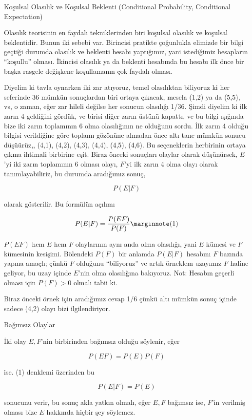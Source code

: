 \documentclass[12pt,fleqn]{article}\usepackage{../../common}
\begin{document}
Koşulsal Olasılık ve Koşulsal Beklenti  (Conditional Probability, Conditional Expectation)

Olasılık teorisinin en faydalı tekniklerinden biri koşulsal olasılık ve koşulsal
beklentidir. Bunun iki sebebi var. Birincisi pratikte çoğunlukla elimizde bir
bilgi geçtiği durumda olasılık ve beklenti hesabı yaptığımız, yani istediğimiz
hesapların ``koşullu'' olması. İkincisi olasılık ya da beklenti hesabında bu
hesabı ilk önce bir başka rasgele değişkene koşullamanın çok faydalı olması.

Diyelim ki tavla oynarken iki zar atıyoruz, temel olasılıktan biliyoruz ki her
seferinde 36 mümkün sonuçlardan biri ortaya çıkacak, mesela (1,2) ya da (5,5),
vs, o zaman, eğer zar hileli değilse her sonucun olasılığı 1/36. Şimdi diyelim
ki ilk zarın 4 geldiğini gördük, ve birisi diğer zarın üstünü kapattı, ve bu
bilgi ışığında bize iki zarın toplamının 6 olma olasılığının ne olduğunu
sordu. İlk zarın 4 olduğu bilgisi verildiğine göre toplamı gözönüne almadan önce
altı tane mümkün sonucu düşüürüz,, (4,1), (4,2), (4,3), (4,4), (4,5), (4,6). Bu
seçeneklerin herbirinin ortaya çıkma ihtimali birbirine eşit. Biraz önceki
sonuçları olaylar olarak düşünürsek, $E$'yi iki zarın toplamının 6 olması olayı,
$F$'yi ilk zarın 4 olma olayı olarak tanımlayabiliriz, bu durumda aradığımız
sonuç,

$$ P(E|F) $$

olarak gösterilir. Bu formülün açılımı

$$ P(E|F) = \frac{P(EF)}{P(F)}
\mlabel{1}$$

$P(EF)$ hem $E$ hem $F$ olaylarının aynı anda olma olasılığı, yani $E$ kümesi ve
$F$ kümesinin kesişimi. Bölendeki $P(F)$ bir anlamda $P(E|F)$ hesabını $F$
bazında yapma amaçlı; çünkü $F$ olduğunu ``biliyoruz'' ve artık örneklem
uzayımız $F$ haline geliyor, bu uzay içinde $E$'nin olma olasılığına
bakıyoruz. Not: Hesabın geçerli olması için $P(F)>0$ olmalı tabii ki. 

Biraz önceki örnek için aradığımız cevap 1/6 çünkü altı mümkün sonuç içinde
sadece (4,2) olayı bizi ilgilendiriyor. 

Bağımsız Olaylar

İki olay $E,F$'nin birbirinden bağımsız olduğu söylenir, eğer

$$ P(EF) = P(E)P(F) $$

ise. (1) denklemi üzerinden bu

$$ P(E|F) = P(E) $$

sonucunu verir, bu sonuç akla yatkın olmalı, eğer $E,F$ bağımsız ise, $F$'in
verilmiş olması bize $E$ hakkında hiçbir şey söylemez. 
\end{document}
